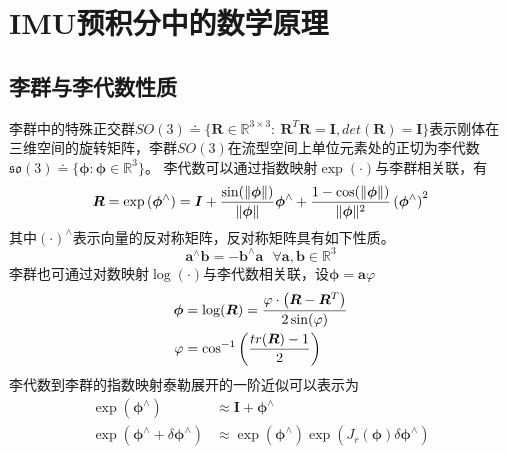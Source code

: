 


\chapter{IMU预积分中的数学原理}

\section*{李群与李代数性质}

李群中的特殊正交群$SO(3) \doteq \{ \boldsymbol{R} \in \mathds{R}^{3 \times 3}:\ \boldsymbol{R}^T \boldsymbol{R}=\boldsymbol{I},det(\boldsymbol{R})=\boldsymbol{I} \}$表示刚体在三维空间的旋转矩阵，李群$SO(3)$在流型空间上单位元素处的正切为李代数$\mathfrak{so}(3) \doteq \{ \boldsymbol{\phi}: \boldsymbol{\phi} \in  \mathds{R}^3  \}$。
李代数可以通过指数映射$\exp(\cdot)$与李群相关联，有
\begin{equation}
\label{equ1}
\boldsymbol{R} = \exp \left( \boldsymbol{\phi}^\wedge \right) = \boldsymbol{I}+{ \sin( \Vert \boldsymbol{\phi} \Vert) \over \Vert \boldsymbol{\phi} \Vert } \boldsymbol{\phi}^{\wedge} + { {1-\cos(\Vert \boldsymbol{\phi} \Vert)} \over \Vert \boldsymbol{\phi} \Vert^2 }\left(\boldsymbol{\phi}^{\wedge}\right)^2
\end{equation}
其中$(\cdot)^\wedge$表示向量的反对称矩阵，反对称矩阵具有如下性质。
\begin{equation}
\boldsymbol{a}^\wedge \boldsymbol{b} = - \boldsymbol{b}^\wedge \boldsymbol{a} \ \ \ \forall \boldsymbol{a},\boldsymbol{b} \in \mathds{R}^3
\end{equation}
李群也可通过对数映射$\log(\cdot)$与李代数相关联，设$\boldsymbol{\phi} = \boldsymbol{a} \varphi$
\begin{equation}
\label{equ2}
\begin{aligned}
\boldsymbol{\phi} &= \log(\boldsymbol{R}) = { \varphi \cdot \left(\boldsymbol{R} - \boldsymbol{R}^T \right)  \over 2 \sin(\varphi) }
\\
\varphi &= \cos^{-1} \left( tr(\boldsymbol{R})-1 \over 2 \right)
\end{aligned}
\end{equation}
李代数到李群的指数映射泰勒展开的一阶近似可以表示为
\begin{equation}
\label{equ3}
\begin{aligned}
\exp\left( \boldsymbol{\phi}^{\wedge} \right) & \approx  \boldsymbol{I} + \boldsymbol{\phi}^{\wedge}
\\
\exp\left( \boldsymbol{\phi}^{\wedge} + \delta\boldsymbol{\phi}^{\wedge}  \right) & \approx \exp \left( \boldsymbol{\phi}^{\wedge} \right)  \exp \left( J_r\left( \boldsymbol{\phi} \right) \delta\boldsymbol{\phi}^{\wedge} \right)
\end{aligned}
\end{equation}
